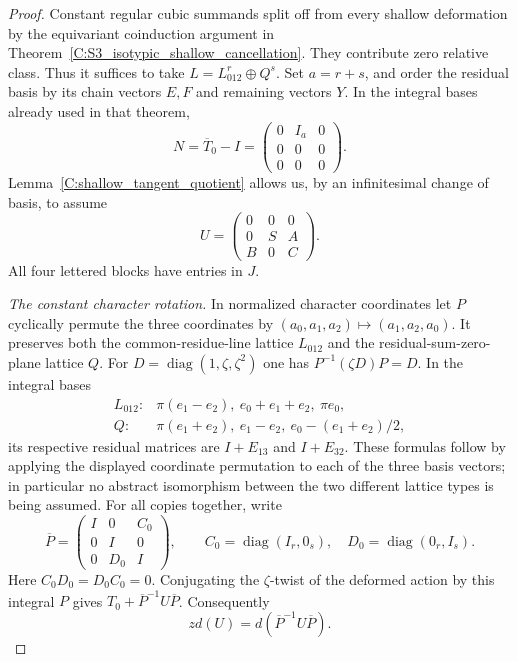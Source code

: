 \begin{proof}
Constant regular cubic summands split off from every shallow
deformation by the equivariant coinduction argument in
Theorem~\ref{C:S3_isotypic_shallow_cancellation}.
They contribute zero relative class.
Thus it suffices to take
$L=L_{012}^{r}\oplus Q^{s}$.
Set $a=r+s$, and order the residual basis by its chain
vectors $E,F$ and remaining vectors $Y$.
In the integral bases already used in that theorem,
\[
 N=\overline T_0-I=
       \begin{pmatrix}0&I_a&0\\0&0&0\\0&0&0\end{pmatrix}.
\]
Lemma~\ref{C:shallow_tangent_quotient} allows us, by an
infinitesimal change of basis, to assume
\[
 U=\begin{pmatrix}0&0&0\\0&S&A\\B&0&C\end{pmatrix}.
                                                               \tag{C.1.MT4}
\]
All four lettered blocks have entries in $J$.

\emph{The constant character rotation.}
In normalized character coordinates let $P$ cyclically
permute the three coordinates by
$(a_0,a_1,a_2)\mapsto(a_1,a_2,a_0)$.
It preserves both the common-residue-line lattice $L_{012}$
and the residual-sum-zero-plane lattice $Q$.
For $D=\operatorname{diag}(1,\zeta,\zeta^2)$ one has
$P^{-1}(\zeta D)P=D$.
In the integral bases
\[
 \begin{array}{ll}
 L_{012}:&\pi(e_1-e_2),\ e_0+e_1+e_2,\ \pi e_0,\\
 Q:&\pi(e_1+e_2),\ e_1-e_2,\ e_0-(e_1+e_2)/2,
 \end{array}
\]
its respective residual matrices are $I+E_{13}$ and
$I+E_{32}$.
These formulas follow by applying the displayed coordinate
permutation to each of the three basis vectors; in particular
no abstract isomorphism between the two different lattice
types is being assumed.
For all copies together, write
\[
 \overline P=
 \begin{pmatrix}I&0&C_0\\0&I&0\\0&D_0&I\end{pmatrix},
 \qquad
 C_0=\operatorname{diag}(I_r,0_s),\quad
 D_0=\operatorname{diag}(0_r,I_s).
                                                               \tag{C.1.MT5}
\]
Here $C_0D_0=D_0C_0=0$.
Conjugating the $\zeta$-twist of the deformed action by
this integral $P$ gives $T_0+\overline P^{-1}U\overline P$.
Consequently
\[
                 z d(U)=d(\overline P^{-1}U\overline P).
                                                               \tag{C.1.MT6}
\]


\end{proof}
